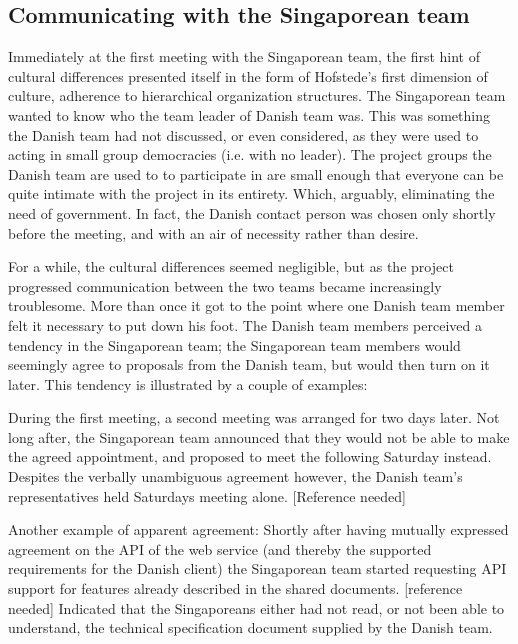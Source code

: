 \subsection{Communicating with the Singaporean team}
\label{sec:communicating}

Immediately at the first meeting with the Singaporean team, the first hint of
cultural differences presented itself in the form of Hofstede's first dimension
of culture, adherence to hierarchical organization structures\cite{surprises}.
The Singaporean team wanted to know who the team leader of Danish team was.
This was something the Danish team had not discussed, or even considered, as
they were used to acting in small group democracies (i.e. with no leader). The
project groups the Danish team are used to to participate in are small enough
that everyone can be quite intimate with the project in its entirety. Which,
arguably, eliminating the need of government. In fact, the Danish contact
person was chosen only shortly before the meeting, and with an air of necessity
rather than desire.

For a while, the cultural differences seemed negligible, but as the project
progressed communication between the two teams became increasingly troublesome.
More than once it got to the point where one Danish team member felt it necessary
to put down his foot\cite{enough}. The Danish team members perceived a tendency in the Singaporean
team; the Singaporean team members would seemingly agree to proposals from the Danish team, but
would then turn on it later. This tendency is illustrated by a couple of
examples:

During the first meeting, a second meeting was arranged for two days later. Not
long after, the Singaporean team announced that they would not be able to make the
agreed appointment, and proposed to meet the following Saturday instead.
Despites the verbally unambiguous agreement however, the Danish team's
representatives held Saturdays meeting alone. [Reference needed]

Another example of apparent agreement: Shortly after having mutually expressed
agreement on the API of the web service (and thereby the supported requirements
for the Danish client) the Singaporean team started requesting API support for features
already described in the shared documents. [reference needed] Indicated that
the Singaporeans either had not read, or not been able to understand, the technical
specification document supplied by the Danish team.

